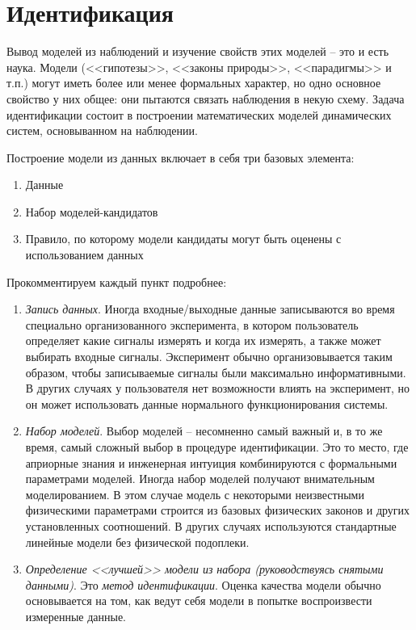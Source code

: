 \documentclass[12pt,a4paper]{article}
\begin{document}
\section{Идентификация}

Вывод моделей из наблюдений и изучение свойств этих моделей -- это и есть наука. Модели (<<гипотезы>>, <<законы природы>>, <<парадигмы>> и т.п.) могут иметь более или менее формальных характер, но одно основное свойство у них общее: они пытаются связать наблюдения в некую схему. Задача идентификации состоит в построении математических моделей динамических систем, основыванном на наблюдении.

Построение модели из данных включает в себя три базовых элемента:

\begin{enumerate}
	\item Данные
	\item Набор моделей-кандидатов
	\item Правило, по которому модели кандидаты могут быть оценены с использованием данных
\end{enumerate}

Прокомментируем каждый пункт подробнее:

\begin{enumerate}
	\item \textit{Запись данных}. Иногда входные/выходные данные записываются во время специально организованного эксперимента, в котором пользователь определяет какие сигналы измерять и когда их измерять, а также может выбирать входные сигналы. Эксперимент обычно организовывается таким образом, чтобы записываемые сигналы были максимально информативными. В других случаях у пользователя нет возможности влиять на эксперимент, но он может использовать данные нормального функционирования системы.

	\item \textit{Набор моделей}. Выбор моделей -- несомненно самый важный и, в то же время, самый сложный выбор в процедуре идентификации. Это то место, где априорные знания и инженерная интуиция комбинируются с формальными параметрами моделей. Иногда набор моделей получают внимательным моделированием. В этом случае модель с некоторыми неизвестными физическими параметрами строится из базовых физических законов и других установленных соотношений. В других случаях используются стандартные линейные модели без физической подоплеки.

	\item \textit{Определение <<лучшей>> модели из набора (руководствуясь снятыми данными)}. Это \textit{метод идентификации}. Оценка качества модели обычно основывается на том, как ведут себя модели в попытке воспроизвести измеренные данные.
\end{enumerate}
\end{document}
